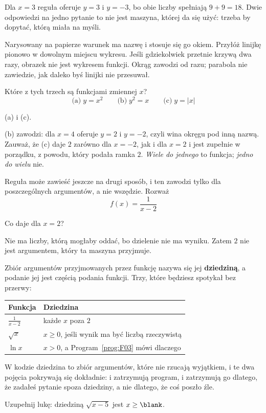 \begin{fr}
Dla $x = 3$ reguła oferuje $y = 3$ i $y = -3$, bo obie liczby spełniają
$9 + 9 = 18$. Dwie odpowiedzi na jedno pytanie to nie jest maszyna, której da
się użyć: trzeba by dopytać, którą miała na myśli.

Narysowany na papierze warunek ma nazwę i stosuje się go okiem. Przyłóż
linijkę pionowo w dowolnym miejscu wykresu. Jeśli gdziekolwiek przetnie
krzywą dwa razy, obrazek nie jest wykresem funkcji. Okrąg zawodzi od razu;
parabola nie zawiedzie, jak daleko byś linijki nie przesuwał.

Które z tych trzech są funkcjami zmiennej $x$?
\[ \text{(a)}\; y = x^{2} \qquad \text{(b)}\; y^{2} = x \qquad
   \text{(c)}\; y = \lvert x \rvert \]
\dotline
\nextframe
\end{fr}

\begin{fr}
\begin{ansblock}
(a) i (c).
\end{ansblock}

(b) zawodzi: dla $x = 4$ oferuje $y = 2$ i $y = -2$, czyli wina okręgu pod
inną nazwą. Zauważ, że (c) daje $2$ zarówno dla $x = -2$, jak i dla $x = 2$ i
jest zupełnie w porządku, z powodu, który podała ramka $2$.
\emph{Wiele do jednego} to funkcja; \emph{jedno do wielu} nie.

Reguła może zawieść jeszcze na drugi sposób, i ten zawodzi tylko dla
poszczególnych argumentów, a nie wszędzie. Rozważ
\[ f(x) = \frac{1}{x - 2} \]

Co daje dla $x = 2$?
\nextframe
\end{fr}

\begin{fr}
Nie ma liczby, którą mogłaby oddać, bo dzielenie nie ma wyniku. Zatem $2$ nie
jest argumentem, który ta maszyna przyjmuje.

Zbiór argumentów przyjmowanych przez funkcję nazywa się jej
\textbf{dziedziną}, a podanie jej jest częścią podania funkcji. Trzy, które
będziesz spotykał bez przerwy:

\begin{center}
\begin{tabular}{ll}
\toprule
Funkcja & Dziedzina \\
\midrule
$\frac{1}{x - 2}$ & każde $x$ poza $2$ \\
$\sqrt{x}$ & $x \ge 0$, jeśli wynik ma być liczbą rzeczywistą \\
$\ln x$ & $x > 0$, a Program~\ref{prog:F03} mówi dlaczego \\
\bottomrule
\end{tabular}
\end{center}

W kodzie dziedzina to zbiór argumentów, które nie rzucają wyjątkiem, i te dwa
pojęcia pokrywają się dokładnie:  i 
zatrzymują program, i zatrzymują go dlatego, że zadałeś pytanie spoza
dziedziny, a nie dlatego, że coś poszło źle.

Uzupełnij lukę: dziedziną $\sqrt{x - 5}$ jest $x \ge \blank$.
\dotline
\nextframe
\end{fr}

